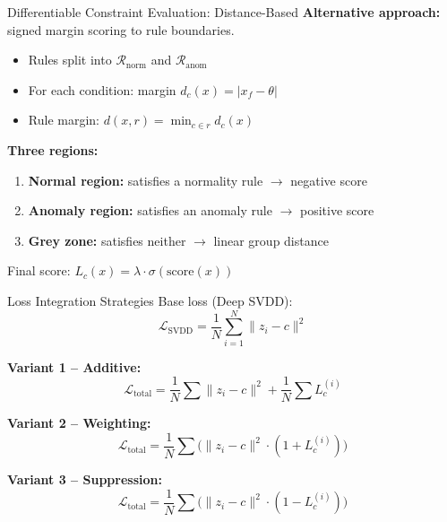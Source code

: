 \documentclass[aspectratio=169]{beamer}
\begin{document}
\begin{frame}{Differentiable Constraint Evaluation: Distance-Based}
    \textbf{Alternative approach:} signed margin scoring to rule boundaries.

    \begin{itemize}
        \item Rules split into $\mathcal{R}_{\text{norm}}$ and $\mathcal{R}_{\text{anom}}$
        \item For each condition: margin $d_c(x) = |x_f - \theta|$
        \item Rule margin: $d(x, r) = \min_{c \in r} d_c(x)$
    \end{itemize}

    \textbf{Three regions:}
    \begin{enumerate}
        \item \textbf{Normal region:} satisfies a normality rule $\rightarrow$ negative score
        \item \textbf{Anomaly region:} satisfies an anomaly rule $\rightarrow$ positive score
        \item \textbf{Grey zone:} satisfies neither $\rightarrow$ linear group distance
    \end{enumerate}

    \vspace{0.2cm}
    Final score: $L_c(x) = \lambda \cdot \sigma(\text{score}(x))$
\end{frame}

\begin{frame}{Loss Integration Strategies}
    Base loss (Deep SVDD):
    \[
    \mathcal{L}_{\text{SVDD}} = \frac{1}{N} \sum_{i=1}^{N} \| z_i - c \|^2
    \]

    \textbf{Variant 1 -- Additive:}
    \[
    \mathcal{L}_{\text{total}} = \frac{1}{N}\sum \|z_i - c\|^2 + \frac{1}{N}\sum L_c^{(i)}
    \]

    \textbf{Variant 2 -- Weighting:}
    \[
    \mathcal{L}_{\text{total}} = \frac{1}{N}\sum \bigl( \|z_i - c\|^2 \cdot (1 + L_c^{(i)}) \bigr)
    \]

    \textbf{Variant 3 -- Suppression:}
    \[
    \mathcal{L}_{\text{total}} = \frac{1}{N}\sum \bigl( \|z_i - c\|^2 \cdot (1 - L_c^{(i)}) \bigr)
    \]
\end{frame}
\end{document}
